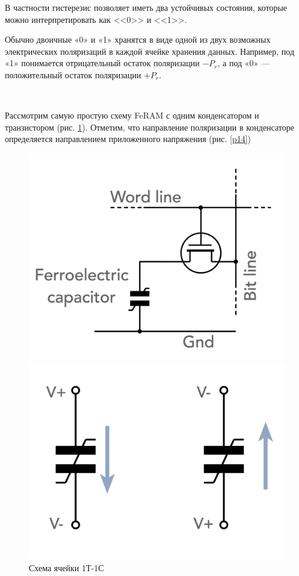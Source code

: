 \documentclass[a4paper]{article}
\begin{document}
В частности гистерезис позволяет иметь два устойчивых состояния, которые можно интерпретировать как <<0>> и <<1>>. 

Обычно двоичные «0» и «1» хранятся в виде одной из двух возможных электрических поляризаций в каждой ячейке хранения данных. Например, под «1» понимается отрицательный остаток поляризации $-P_r$, а под «0» — положительный остаток поляризации $+P_r$.

\

Рассмотрим самую простую схему FeRAM с одним конденсатором и транзистором (рис. \ref{p10}). Отметим, что направление поляризации в конденсаторе определяется направлением приложенного напряжения (рис. \ref{p14})

\begin{figure}[H]
\begin{center}
\begin{minipage}[h]{0.35\linewidth}
\includegraphics[width=1\linewidth]{p10.png}
\caption{Схема  ячейки 1Т-1С} %
\label{p10} %
\end{minipage}
\hfill 
\begin{minipage}[h]{0.4\linewidth}
\includegraphics[width=1\linewidth]{p14.png}

\end{minipage}
\end{center}
\end{figure}
\end{document}
